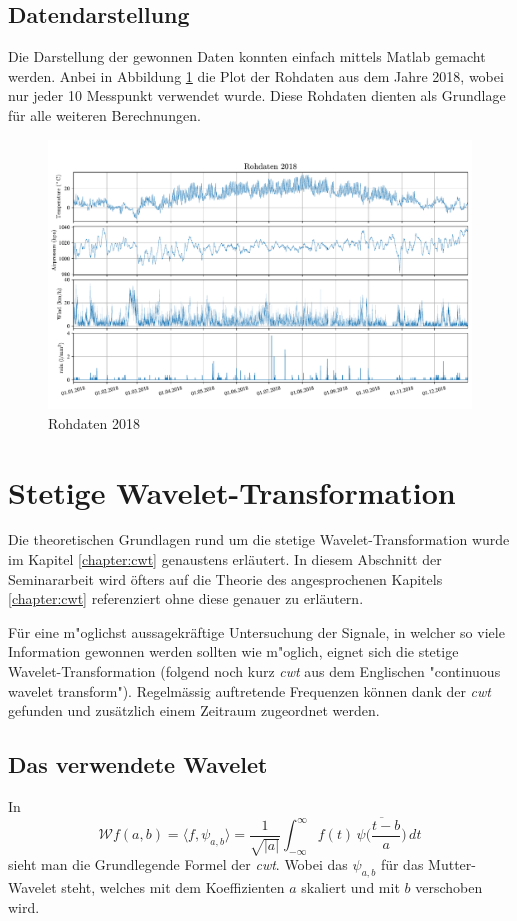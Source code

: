 \begin{refsection}
\subsection{Datendarstellung}
Die Darstellung der gewonnen Daten konnten einfach mittels Matlab gemacht werden.
Anbei in Abbildung \ref{fig:rawdata} \space die Plot der Rohdaten aus dem Jahre 2018, wobei nur jeder 10 Messpunkt verwendet wurde.
Diese Rohdaten dienten als Grundlage für alle weiteren Berechnungen. 
\begin{figure}
	\centering
	\includegraphics[width=1\textwidth]{papers/wwt/images/raw.pdf}
	\caption{Rohdaten 2018}
	\label{fig:rawdata}
\end{figure}

\newpage
\section{Stetige Wavelet-Transformation}
Die theoretischen Grundlagen rund um die stetige Wavelet-Transformation wurde im Kapitel \ref{chapter:cwt} genaustens erläutert. 
In diesem Abschnitt der Seminararbeit wird öfters auf die Theorie des angesprochenen Kapitels \ref{chapter:cwt} referenziert ohne diese genauer zu erläutern. 

Für eine m"oglichst aussagekräftige Untersuchung der Signale, in welcher so viele Information gewonnen werden sollten wie m"oglich, eignet sich die stetige Wavelet-Transformation (folgend noch kurz \textit{cwt} aus dem Englischen "continuous wavelet transform"). 
Regelmässig auftretende Frequenzen können dank der \textit{cwt} gefunden und zusätzlich einem Zeitraum zugeordnet werden.
\subsection{Das verwendete Wavelet}
In
\begin{equation}
\mathcal{W}f (a,b)
=
\langle f,\psi_{a,b}\rangle
=
\frac{1}{\sqrt{|a|}}\int_{-\infty}^\infty f(t)\,\overline{
	\psi\biggl(\frac{t-b}{a}\biggr)}\,dt
\label{eq:cwt1}
\end{equation}
sieht man die Grundlegende Formel der \textit{cwt}.
Wobei das $\psi_{a,b}$ für das Mutter-Wavelet steht, welches mit dem Koeffizienten $a$ skaliert und mit $b$ verschoben wird.


\end{refsection}

